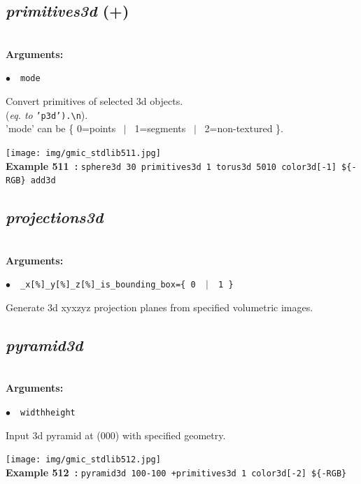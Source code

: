 \documentclass[a4paper,10.5pt,twoside]{book}
\def\comma{\discretionary{,}{}{,}}
\newcommand{\Cb}[1]{\textcolor{cb}{#1}}
\begin{document}
\subsection{\emph{primitives3d} (+)}\vspace*{-0.7em}
~\\\textbf{\Cb{Arguments: }}\begin{flushleft}
{\small \Cb{\hspace*{0.5cm}$\bullet$~~\texttt{mode}}}\end{flushleft}
Convert primitives of selected 3d objects.
~\\(\emph{eq. to} {\small \texttt{'p3d').\textbackslash n}}).
~\\'mode' can be \{ 0=points ~$|$~ 1=segments ~$|$~ 2=non-textured \}.
\begin{center}\texttt{[image: img/gmic\_stdlib511.jpg]}\\
{\footnotesize \textbf{Example 511~:} \texttt{sphere3d 30 primitives3d 1 torus3d 50{\comma}10 color3d[-1] \$\{-RGB\} add3d}}
\end{center}

\subsection{\emph{projections3d} }\vspace*{-0.7em}
~\\\textbf{\Cb{Arguments: }}\begin{flushleft}
{\small \Cb{\hspace*{0.5cm}$\bullet$~~\texttt{\_x[\%]{\comma}\_y[\%]{\comma}\_z[\%]{\comma}\_is\_bounding\_box=\{ 0 ~$|$~ 1 \}}}}\end{flushleft}
Generate 3d xy{\comma}xz{\comma}yz projection planes from specified volumetric images.


\subsection{\emph{pyramid3d} }\vspace*{-0.7em}
~\\\textbf{\Cb{Arguments: }}\begin{flushleft}
{\small \Cb{\hspace*{0.5cm}$\bullet$~~\texttt{width{\comma}height}}}\end{flushleft}
Input 3d pyramid at (0{\comma}0{\comma}0){\comma} with specified geometry.
\begin{center}\texttt{[image: img/gmic\_stdlib512.jpg]}\\
{\footnotesize \textbf{Example 512~:} \texttt{pyramid3d 100{\comma}-100 +primitives3d 1 color3d[-2] \$\{-RGB\}}}
\end{center}
\end{document}
